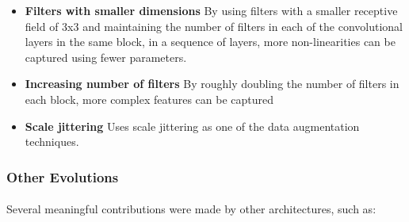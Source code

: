 \begin{itemize}
    \item \textbf{Filters with smaller dimensions} By using filters with a smaller receptive field of 3x3 and maintaining the number of filters in each of the convolutional layers in the same block, in a sequence of layers, more non-linearities can be captured using fewer parameters.
 
    \item \textbf{Increasing number of filters} By roughly doubling the number of filters in each block, more complex features can be captured
    \item \textbf{Scale jittering} Uses scale jittering as one of the data augmentation techniques.

\end{itemize}

\subsubsection{Other Evolutions}
\paragraph{}
Several meaningful contributions were made by other architectures, such as:

